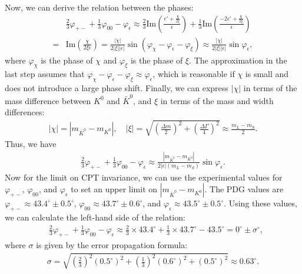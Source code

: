 Now, we can derive the relation between the phases:
\begin{align}
    &\frac{2}{3} \varphi_{+-} + \frac{1}{3} \varphi_{00} - \varphi_\epsilon \approx \frac{2}{3} \text{Im}\left(\frac{\epsilon' + \frac{\chi}{2\xi}}{\epsilon}\right) + \frac{1}{3} \text{Im}\left(\frac{-2\epsilon' + \frac{\chi}{2\xi}}{\epsilon}\right)\\
    =& \text{Im}\left(\frac{\chi}{2\xi \epsilon}\right) = \frac{|\chi|}{2|\xi||\epsilon|}\sin(\varphi_\chi - \varphi_\epsilon-\varphi_\xi) \approx \frac{|\chi|}{2|\xi||\epsilon|}\sin\varphi_\epsilon,
\end{align}
where $\varphi_\chi$ is the phase of $\chi$ and $\varphi_\xi$ is the phase of $\xi$. The approximation in the last step assumes that $\varphi_\chi - \varphi_\epsilon - \varphi_\xi \approx \varphi_\epsilon$, which is reasonable if $\chi$ is small and does not introduce a large phase shift. Finally, we can express $|\chi|$ in terms of the mass difference between $K^0$ and $\bar{K}^0$, and $\xi$ in terms of the mass and width differences:
\begin{align}
    |\chi| = |m_{\bar{K}^0} - m_{K^0}|, \quad |\xi| = \sqrt{\left(\frac{\Delta m}{2}\right)^2 + \left(\frac{\Delta \Gamma}{4}\right)^2} \approx \frac{m_L - m_S}{2}.
\end{align} Thus, we have
\begin{align}
    \frac{2}{3} \varphi_{+-} + \frac{1}{3} \varphi_{00} - \varphi_\epsilon \approx \frac{|m_{\bar{K}^0} - m_{K^0}|}{2|\epsilon|(m_L - m_S)}\sin\varphi_\epsilon.
\end{align}
Now for the limit on CPT invariance, we can use the experimental values for $\varphi_{+-}$, $\varphi_{00}$, and $\varphi_\epsilon$ to set an upper limit on $|m_{\bar{K}^0} - m_{K^0}|$. The PDG values are $\varphi_{+-} \approx 43.4^\circ\pm 0.5^\circ$, $\varphi_{00} \approx 43.7^\circ\pm 0.6^\circ$, and $\varphi_\epsilon \approx 43.5^\circ\pm 0.5^\circ$. Using these values, we can calculate the left-hand side of the relation:
\begin{align}
    &\frac{2}{3} \varphi_{+-} + \frac{1}{3} \varphi_{00} - \varphi_\epsilon \approx \frac{2}{3} \times 43.4^\circ + \frac{1}{3} \times 43.7^\circ - 43.5^\circ = 0^\circ \pm \sigma^\circ,
\end{align}
where $\sigma$ is given by the error propagation formula:
\begin{align}
    \sigma = \sqrt{\left(\frac{2}{3}\right)^2 (0.5^\circ)^2 + \left(\frac{1}{3}\right)^2 (0.6^\circ)^2 + (0.5^\circ)^2} \approx 0.63^\circ.
\end{align}
